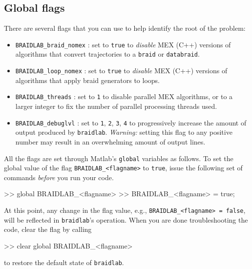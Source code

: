\documentclass[12pt]{article}
\newcommand{\braidlab}{\texttt{braidlab}}%
\begin{document}
\subsection{Global flags}
\label{sec:global-flags}

%
There are several flags that you can use to help identify the root of the
problem:
\begin{itemize}
\item \lstinline{BRAIDLAB_braid_nomex}%
  :
  set to \lstinline{true} to \emph{disable} MEX %
  (C++) versions of algorithms that convert trajectories to a
  \lstinline{braid} or \lstinline{databraid}.
\item \lstinline{BRAIDLAB_loop_nomex}%
  :
  set to \lstinline{true} to \emph{disable} MEX %
  (C++) versions of algorithms that apply braid generators to loops.
\item \lstinline{BRAIDLAB_threads}%
  : set to
  \lstinline{1} to disable parallel MEX %
  algorithms, or to a larger integer to fix the number of parallel processing
  threads used.
\item \lstinline{BRAIDLAB_debuglvl}%
  : set
  to \lstinline{1}, \lstinline{2}, \lstinline{3}, \lstinline{4} to
  progressively increase the amount of output produced by
  \braidlab. \emph{Warning:} setting this flag to any positive number may
  result in an overwhelming amount of output lines.
\end{itemize}

All the flags are set through Matlab's \lstinline{global} variables as follows.
To set the global value of the flag \lstinline{BRAIDLAB_<flagname>} to \lstinline{true}, issue the following set of commands \emph{before} you run your code.
\begin{lstbraidlab}
>> global BRAIDLAB_<flagname>
>> BRAIDLAB_<flagname> = true;
\end{lstbraidlab}
At this point, any change in the flag value, e.g.,
\lstinline{BRAIDLAB_<flagname> = false}, will be reflected in \braidlab's
operation. When you are done troubleshooting the code, clear the flag by
calling
\begin{lstbraidlab}
>> clear global BRAIDLAB_<flagname>
\end{lstbraidlab}
to restore the default state of \braidlab.
%
\end{document}
